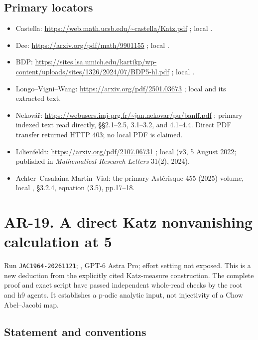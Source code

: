 \documentclass[11pt,a4paper]{article}
\providecommand{\tightlist}{\setlength{\itemsep}{0pt}\setlength{\parskip}{0pt}}
\begin{document}
\subsection{Primary locators}\label{primary-locators}

\begin{itemize}
\tightlist
\item
  Castella: \url{https://web.math.ucsb.edu/~castella/Katz.pdf}
  ; local .
\item
  Dee: \url{https://arxiv.org/pdf/math/9901155} ; local
  .
\item
  BDP:
  \url{https://sites.lsa.umich.edu/kartikp/wp-content/uploads/sites/1326/2024/07/BDP5-hl.pdf}
  ; local .
\item
  Longo--Vigni--Wang: \url{https://arxiv.org/pdf/2501.03673} ; local
  \newline{} and its extracted text.
\item
  Nekovář:
  \url{https://webusers.imj-prg.fr/~jan.nekovar/pu/banff.pdf} ;
  primary indexed text read directly, §§2.1--2.5, 3.1--3.2, and
  4.1--4.4. Direct PDF transfer returned HTTP 403; no local PDF is
  claimed.
\item
  Lilienfeldt: \url{https://arxiv.org/pdf/2107.06731} ; local
   (v3, 5 August 2022; published
  in \emph{Mathematical Research Letters} 31(2), 2024).
\item
  Achter--Casalaina-Martin--Vial: the primary Astérisque 455 (2025)
  volume, local , §3.2.4,
  equation (3.5), pp.17--18.
\end{itemize}
\section{AR-19. A direct Katz nonvanishing calculation at
5}\label{ar-19.-a-direct-katz-nonvanishing-calculation-at-5}

Run \texttt{JAC1964-20261121}; , GPT-6
Astra Pro; effort setting not exposed. This is a new deduction from the
explicitly cited Katz-measure construction. The complete proof and exact
script have passed independent whole-read checks by the root and h9
agents. It establishes a p-adic analytic input, not injectivity of a
Chow Abel--Jacobi map.

\subsection{Statement and conventions}\label{statement-and-conventions}
\end{document}
